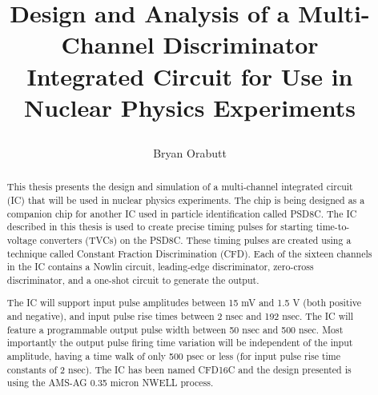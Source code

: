 \documentclass[12pt,oneside,final]{siuethesis}
\author{Bryan Orabutt}
\title{\protect\parbox{\textwidth}{\protect\centering Design and Analysis of a Multi-Channel Discriminator\protect\\ Integrated Circuit for Use in Nuclear Physics Experiments}}
\theoremstyle{definition}
\begin{document}
\maketitle 

\frontmatter %

\copyrightpage %


\begin{abstract}

\par This thesis presents the design and simulation of a multi-channel integrated circuit (IC) that will be used in nuclear physics experiments. The chip is being designed as a companion chip for another IC used in particle identification called PSD8C. The IC described in this thesis is used to create precise timing pulses for starting time-to-voltage converters (TVCs) on the PSD8C. These timing pulses are created using a technique called Constant Fraction Discrimination (CFD). Each of the sixteen channels in the IC contains a Nowlin circuit, leading-edge discriminator, zero-cross discriminator, and a one-shot circuit to generate the output. \par The IC will support input pulse amplitudes between 15 mV and 1.5 V (both positive and negative), and input pulse rise times between 2 nsec and 192 nsec. The IC will feature a programmable output pulse width between 50 nsec and 500 nsec. Most importantly the output pulse firing time variation will be independent of the input amplitude, having a time walk of only 500 psec or less (for input pulse rise time constants of 2 nsec). The IC has been named CFD16C and the design presented is using the AMS-AG 0.35 micron NWELL process.
\end{abstract}


\end{document}
